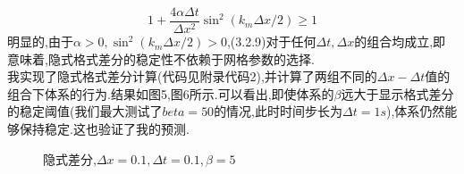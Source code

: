 \documentclass{article}
\numberwithin{equation}{subsection}
\begin{document}
\begin{equation}
    1+\frac{4 \alpha \Delta t}{\Delta x^{2}} \sin ^{2}\left(k_{m} \Delta x / 2\right)\geq 1
\end{equation}
明显的,由于$\alpha>0,\sin ^{2}\left(k_{m} \Delta x / 2\right)>0$,(3.2.9)对于任何$\Delta t,\Delta x$的组合均成立,即意味着,隐式格式差分的稳定性不依赖于网格参数的选择.\\
我实现了隐式格式差分计算(代码见附录代码2),并计算了两组不同的$\Delta x-\Delta t$值的组合下体系的行为.结果如图5,图6所示.可以看出,即使体系的$\beta$远大于显示格式差分的稳定阈值(我们最大测试了$beta=50$的情况,此时时间步长为$\Delta t = 1s$),体系仍然能够保持稳定.这也验证了我的预测.
\begin{figure}[H]
\centering
{}
\quad
{}
\quad
{}
\quad
{}
\caption{隐式差分,$\Delta x = 0.1,\Delta t = 0.1,\beta = 5$}
\end{figure}
\end{document}
